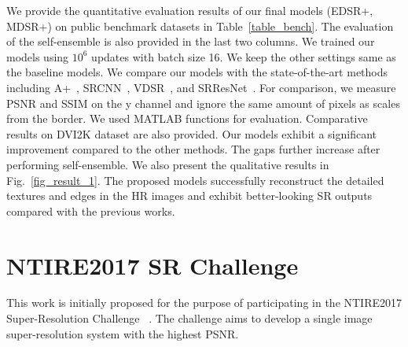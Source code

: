 \documentclass[10pt,twocolumn,letterpaper]{article}
\begin{document}
	We provide the quantitative evaluation results of our final models (EDSR+, MDSR+) on public benchmark datasets in Table~\ref{table_bench}. 
	The evaluation of the self-ensemble is also provided in the last two columns. We trained our models using $10^{6}$ updates with batch size 16. We keep the other settings same as the baseline models. 
	We compare our models with the state-of-the-art methods including A+~\cite{timofte2014a+}, SRCNN~\cite{dong2014learning}, VDSR~\cite{kim2016accurate}, and SRResNet~\cite{ledig2016photo}. For comparison, we measure PSNR and SSIM on the y channel and ignore the same amount of pixels as scales from the border.
	We used MATLAB \cite{MATLAB:2016} functions for evaluation. Comparative results on DVI2K dataset are also provided. Our models exhibit a significant improvement compared to the other methods. The gaps further increase after performing self-ensemble. We also present the qualitative results in Fig.~\ref{fig_result_1}. The proposed models successfully reconstruct the detailed textures and edges in the HR images and exhibit better-looking SR outputs compared with the previous works. 

	
	\section{NTIRE2017 SR Challenge}
	
	This work is initially proposed for the purpose of participating in the NTIRE2017 Super-Resolution Challenge ~\cite{Timofte_2017_CVPR_Workshops}.
	The challenge aims to develop a single image super-resolution system with the highest PSNR. 
\end{document}
